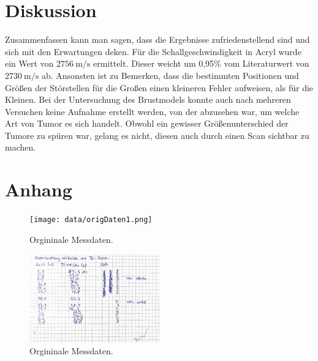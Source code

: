 \section{Diskussion}
\label{sec:Diskussion}

Zusammenfassen kann man sagen, dass die Ergebnisse zufriedenstellend sind und sich mit den Erwartungen deken.
\newline
Für die Schallgeschwindigkeit in Acryl wurde ein Wert von $\SI{2756}{\meter\per\second}$ ermittelt. Dieser weicht um 0,95\% vom Literaturwert von
$\SI{2730}{\meter\per\second}$ ab.
\newline
Ansonsten ist zu Bemerken, dass die bestimmten Positionen und Größen der Störstellen für die Großen einen kleineren Fehler aufweisen, als für die Kleinen.
\newline
Bei der Untersuchung des Brustmodels konnte auch nach mehreren Versuchen keine Aufnahme erstellt werden, von der abzusehen war, um welche Art von Tumor es
sich handelt. Obwohl ein gewisser Größenunterschied der Tumore zu spüren war, gelang es nicht, diesen auch durch einen Scan sichtbar zu machen.

\printbibliography{}

\section*{Anhang}
\label{Anhang}

\begin{figure}[H]
    \centering
    \texttt{[image: data/origDaten1.png]}
    \caption{Orgininale Messdaten.}
    \label{fig:origDaten1}
\end{figure}

\begin{figure}[H]
    \centering
    \includegraphics[width=0.5\textwidth]{data/origDaten2.png}
    \caption{Orgininale Messdaten.}
    \label{fig:origDaten2}
\end{figure}